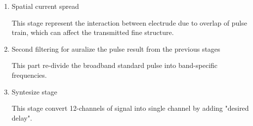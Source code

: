 \begin{enumerate}
	\item Spatial current spread
	
	This stage represent the interaction between electrude due to overlap of pulse train, which can affect the transmitted fine structure.
	
	\item Second filtering for auralize the pulse result from the previous stages
	
	This part re-divide the broadband standard pulse into band-specific frequencies. 
	
	\item Syntesize stage
	
	This stage convert 12-channels of signal into single channel by adding "desired delay". 
	
\end{enumerate}




